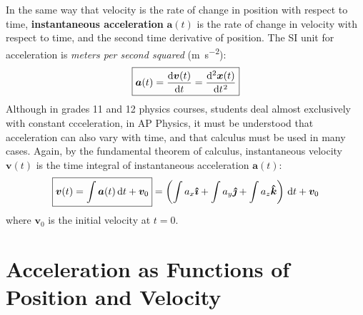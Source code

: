 \documentclass{../../../oss-handout}
\begin{document}
In the same way that velocity is the rate of change in position with respect
to time, \textbf{instantaneous acceleration} $\bm{a}(t)$ is the rate of change
in velocity with respect to time, and the second time derivative of position.
The SI unit for acceleration is \emph{meters per second squared}
(\si{\metre\per\second\squared}):
\begin{equation}
  \boxed{\bm{a}(t)= \diff{\bm{v}(t)}t=\diff[2]{\bm{x}(t)}t}
\end{equation}
Although in grades 11 and 12 physics courses, students deal almost exclusively
with constant ccceleration, in AP Physics, it must be understood that
acceleration can also vary with time, and that calculus must be used in many
cases.
Again, by the fundamental theorem of calculus, instantaneous velocity
$\bm{v}(t)$ is the time integral of instantaneous acceleration $\bm{a}(t)$:
\begin{equation}
  \boxed{\bm{v}(t)=\int\bm{a}(t)\dl t+\bm{v}_0} =
    \left(\int a_x\bm{\hat{\imath}} +
    \int a_y\bm{\hat{\jmath}} +
    \int a_z\bm{\hat{k}}\right)\dl t +\bm{v}_0
\end{equation}
where $\bm{v}_0$ is the initial velocity at $t=0$.

\section{Acceleration as Functions of Position and Velocity}
\end{document}
